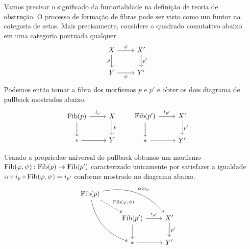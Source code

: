 \begin{obs}
  \label{obs:funtorialidade_classe_de_obstrucao}
  Vamos precisar o significado da funtorialidade na definição de teoria de obstrução.
  O processo de formação de fibras pode ser visto como um funtor na categoria de setas.
  Mais precisamente, considere o quadrado comutativo abaixo em uma categoria pontuada qualquer.
  \begin{equation}
    \label{eq:morfismo_fibracoes}
    \begin{tikzcd}
      X
      \arrow[d, "p" swap]
      \arrow[r, "\varphi"]
      & X'
      \arrow[d, "p'"]
      \\ Y
      \arrow[r, "\psi" swap]
      & Y'
    \end{tikzcd}
  \end{equation}
  Podemos então tomar a fibra dos morfismos $p$ e $p'$ e obter os dois diagrama de pullback mostrados abaixo.
  \begin{displaymath}
    \begin{tikzcd}
      \Fib(p)
      \arrow[d]
      \arrow[r, "i_{p}"]
      & X
      \arrow[d, "p"]
      \\ *
      \arrow[r]
      & Y
    \end{tikzcd}
    \qquad
    \begin{tikzcd}
      \Fib(p')
      \arrow[d]
      \arrow[r, "i_{p'}"]
      & X'
      \arrow[d, "p'"]
      \\ *
      \arrow[r]
      & Y'
    \end{tikzcd}
  \end{displaymath}

  Usando a propriedae universal do pullback obtemos um morfismo $\mathrm{Fib}(\varphi,\psi): \mathrm{Fib}(p) \to \mathrm{Fib}(p')$ caracterizado unicamente por satisfazer a igualdade $\alpha \circ i_{p} \circ \mathrm{Fib}(\varphi,\psi) = i_{p'}$ conforme mostrado no diagrama abaixo.
  \begin{displaymath}
    \begin{tikzcd}
      \Fib(p)
      \arrow[rrd, bend left=30, "\alpha \circ i_{p}"]
      \arrow[rdd, bend right=30]
      \arrow[rd, dashed, "{\Fib(\varphi,\psi)}"]
      \\ & \Fib(p')
      \arrow[r, "i_{p'}"]
      \arrow[d]
      & X'
      \arrow[d, "p'"]
      \\ & *
      \arrow[r]
      & Y'
    \end{tikzcd}
  \end{displaymath}


\end{obs}
